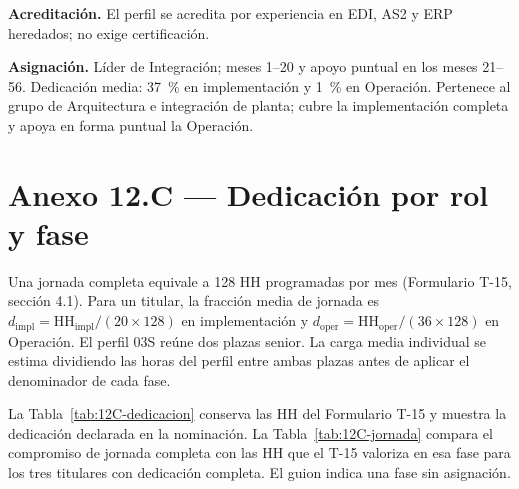 \textbf{Acreditación.} El perfil se acredita por experiencia en EDI, AS2 y ERP heredados; no exige certificación.

\textbf{Asignación.} Líder de Integración; meses 1--20 y apoyo puntual en los meses 21--56. Dedicación media: 37~\% en implementación y 1~\% en Operación. Pertenece al grupo de Arquitectura e integración de planta; cubre la implementación completa y apoya en forma puntual la Operación.

\section{Anexo 12.C — Dedicación por rol y fase}

Una jornada completa equivale a 128 HH programadas por mes (Formulario T-15, sección 4.1). Para un titular, la fracción media de jornada es \(d_{\mathrm{impl}} = \mathrm{HH}_{\mathrm{impl}}/(20\times128)\) en implementación y \(d_{\mathrm{oper}} = \mathrm{HH}_{\mathrm{oper}}/(36\times128)\) en Operación. El perfil 03S reúne dos plazas senior. La carga media individual se estima dividiendo las horas del perfil entre ambas plazas antes de aplicar el denominador de cada fase.

La Tabla~\ref{tab:12C-dedicacion} conserva las HH del Formulario T-15 y muestra la dedicación declarada en la nominación. La Tabla~\ref{tab:12C-jornada} compara el compromiso de jornada completa con las HH que el T-15 valoriza en esa fase para los tres titulares con dedicación completa. El guion indica una fase sin asignación.

